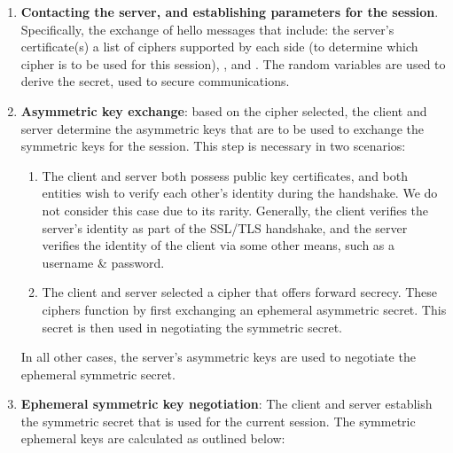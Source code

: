 \documentclass[../main.tex]{subfiles}
\begin{document}
\begin{enumerate}
  \item \textbf{Contacting the server, and establishing parameters for
    the session}. Specifically, the exchange of hello messages that
    include: the server's certificate(s) a list of ciphers supported by
    each side (to determine which cipher is to be used for this session),
    \srandom, and \crandom. The random variables are used to derive the
    secret, used to secure communications.
  \item \textbf{Asymmetric key exchange}: based on the cipher
    selected, the client and server determine the asymmetric keys that are
    to be used to exchange the symmetric keys for the session. This step
    is necessary in two scenarios:
    \begin{enumerate}
      \item The client and server both possess public key
        certificates, and both entities wish to verify each other's identity
        during the handshake. We do not consider this case due to its
        rarity. Generally, the client verifies the server's identity as part
        of the SSL/TLS handshake, and the server verifies the identity of the
        client via some other means, such as a username \& password.
      \item The client and server selected a cipher that offers
        forward secrecy. These ciphers function by first exchanging an
        ephemeral asymmetric secret. This secret is then used in negotiating
        the symmetric secret.
    \end{enumerate} In all other cases, the server's asymmetric keys
    are used to negotiate the ephemeral symmetric secret.
  \item \textbf{Ephemeral symmetric key negotiation}: The client and
    server establish the symmetric secret that is used for the current
    session. The symmetric ephemeral keys are calculated as outlined
    below:


\end{enumerate}
\end{document}
